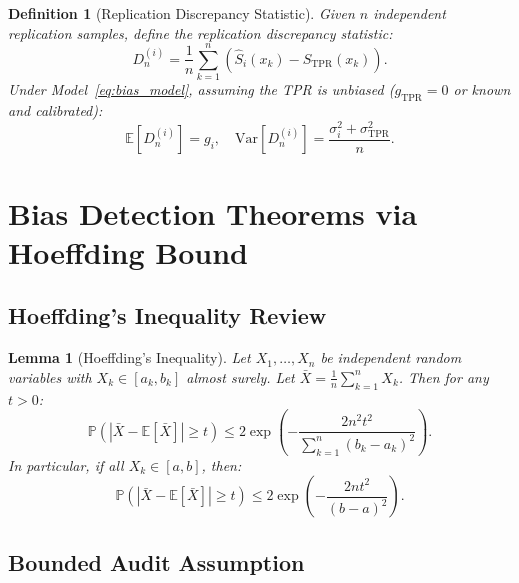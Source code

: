 \documentclass[11pt,a4paper]{article}
\newtheorem{lemma}[theorem]{Lemma}
\newtheorem{definition}[theorem]{Definition}
\theoremstyle{definition}
\newcommand{\E}{\mathbb{E}}
\newcommand{\Var}{\mathrm{Var}}
\newcommand{\Prob}{\mathbb{P}}
\begin{document}
\begin{definition}[Replication Discrepancy Statistic]
\label{def:rep_stat}
Given $n$ independent replication samples, define the replication discrepancy statistic:
\begin{equation}\label{eq:rep_stat_def}
    D_n^{(i)} = \frac{1}{n} \sum_{k=1}^{n} \left(\hat{S}_i(x_k) - \hat{S}_{\text{TPR}}(x_k)\right).
\end{equation}
Under Model~\eqref{eq:bias_model}, assuming the TPR is unbiased ($g_{\text{TPR}} = 0$ or known and calibrated):
\begin{equation}\label{eq:rep_stat_expect}
    \E[D_n^{(i)}] = g_i, \quad \Var[D_n^{(i)}] = \frac{\sigma_i^2 + \sigma_{\text{TPR}}^2}{n}.
\end{equation}
\end{definition}

\section{Bias Detection Theorems via Hoeffding Bound}

\subsection{Hoeffding's Inequality Review}

\begin{lemma}[Hoeffding's Inequality]\label{lem:hoeffding}
Let $X_1, \ldots, X_n$ be independent random variables with $X_k \in [a_k, b_k]$ almost surely. Let $\bar{X} = \frac{1}{n}\sum_{k=1}^{n} X_k$. Then for any $t > 0$:
\begin{equation}\label{eq:hoeffding}
    \Prob\left(|\bar{X} - \E[\bar{X}]| \geq t\right) \leq 2\exp\left(-\frac{2n^2 t^2}{\sum_{k=1}^{n}(b_k - a_k)^2}\right).
\end{equation}
In particular, if all $X_k \in [a, b]$, then:
\begin{equation}\label{eq:hoeffding_simple}
    \Prob\left(|\bar{X} - \E[\bar{X}]| \geq t\right) \leq 2\exp\left(-\frac{2n t^2}{(b-a)^2}\right).
\end{equation}
\end{lemma}

\subsection{Bounded Audit Assumption}
\end{document}
